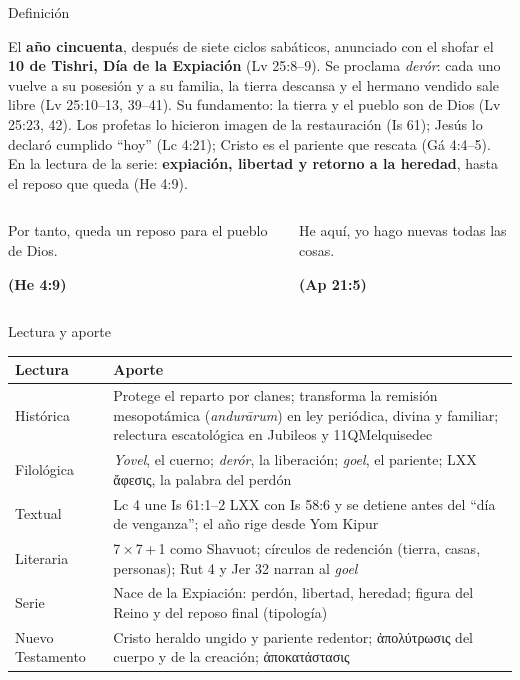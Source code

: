 \documentclass[hyperref={bookmarks=false},aspectratio=169]{beamer}
\newcommand{\grc}[1]{\foreignlanguage{ancientgreek}{#1}}
\newcommand{\fuente}[1]{\par\hfill{\upshape\bfseries\footnotesize\textcolor{tierraroja}{#1}}}
\newcommand{\destacar}[1]{\textbf{\textcolor{tierraroja}{#1}}}
\begin{document}
\begin{frame}{Definición}
\begin{tcolorbox}[colback=papiro,colframe=tierraroja,boxrule=1pt,arc=3pt,left=5pt,right=5pt,title={El Jubileo},fonttitle=\small\bfseries,coltitle=papiro,colbacktitle=tierraroja]
\small\RaggedRight El \destacar{año cincuenta}, después de siete ciclos sabáticos, anunciado con el shofar el \destacar{10 de Tishri, Día de la Expiación} (Lv 25:8--9). Se proclama \emph{derór}: cada uno vuelve a su posesión y a su familia, la tierra descansa y el hermano vendido sale libre (Lv 25:10--13, 39--41). Su fundamento: la tierra y el pueblo son de Dios (Lv 25:23, 42). Los profetas lo hicieron imagen de la restauración (Is 61); Jesús lo declaró cumplido ``hoy'' (Lc 4:21); Cristo es el pariente que rescata (Gá 4:4--5). En la lectura de la serie: \destacar{expiación, libertad y retorno a la heredad}, hasta el reposo que queda (He 4:9).
\end{tcolorbox}
\begin{columns}[t,onlytextwidth]
\begin{column}{0.49\textwidth}
\begin{cita}Por tanto, queda un reposo para el pueblo de Dios.\fuente{(He 4:9)}\end{cita}
\end{column}
\begin{column}{0.49\textwidth}
\begin{cita}He aquí, yo hago nuevas todas las cosas.\fuente{(Ap 21:5)}\end{cita}
\end{column}
\end{columns}
\end{frame}

\begin{frame}{Lectura y aporte}
\fontsize{6.6}{7.8}\selectfont\renewcommand{\arraystretch}{1.18}
\begin{tabular}{@{}L{2.0cm}L{10.0cm}@{}}
\toprule
\textbf{Lectura} & \textbf{Aporte} \\ \midrule
Histórica & Protege el reparto por clanes; transforma la remisión mesopotámica (\emph{andurārum}) en ley periódica, divina y familiar; relectura escatológica en Jubileos y 11QMelquisedec \\
Filológica & \emph{Yovel}, el cuerno; \emph{derór}, la liberación; \emph{goel}, el pariente; LXX \grc{ἄφεσις}, la palabra del perdón \\
Textual & Lc 4 une Is 61:1--2 LXX con Is 58:6 y se detiene antes del ``día de venganza''; el año rige desde Yom Kipur \\
Literaria & 7\,×\,7\,+\,1 como Shavuot; círculos de redención (tierra, casas, personas); Rut 4 y Jer 32 narran al \emph{goel} \\
Serie & Nace de la Expiación: perdón, libertad, heredad; figura del Reino y del reposo final (tipología) \\
Nuevo Testamento & Cristo heraldo ungido y pariente redentor; \grc{ἀπολύτρωσις} del cuerpo y de la creación; \grc{ἀποκατάστασις} \\
\bottomrule
\end{tabular}
\end{frame}
\end{document}
